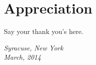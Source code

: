 \vspace*{2cm}
\section*{Appreciation}

Say your thank you's here.

\hfill\emph{Syracuse, New York}\\
\hspace*{0pt}\hfill\emph{March, 2014}
